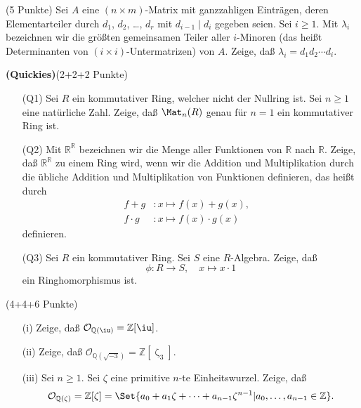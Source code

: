 \documentclass{algsheet}
\begin{document}
\begin{exercise}(5 Punkte)\newline
    Sei \(A\) eine \((n \times m)\)-Matrix mit ganzzahligen Einträgen, deren
    Elementarteiler durch \(d_1\), \(d_2\), \dots, \(d_r\) mit \(d_{i - 1} \mid
    d_i\) gegeben seien. Sei \(i \ge 1\).
    Mit \(\lambda_i\) bezeichnen wir die größten
    gemeinsamen Teiler aller \(i\)-Minoren (das heißt Determinanten von
    \((i \times i)\)-Untermatrizen) von \(A\). Zeige, daß \(\lambda_i = d_1
    d_2 \dotsm d_i\).
\end{exercise}


\newpage

\begin{exercise}\textbf{(Quickies)}(2+2+2 Punkte)\vspace{-1ex}
 \begin{itemize}
  \item [(Q1)]  Sei \(R\) ein kommutativer Ring, welcher nicht der Nullring ist. Sei
    \(n \ge 1\) eine natürliche Zahl. Zeige,
    daß \(\Mat_n(R)\) genau für \(n = 1\) ein kommutativer Ring ist.
  \item [(Q2)] 
    Mit \(\mathbb R^{\mathbb R}\) bezeichnen wir die Menge aller Funktionen von
    \(\mathbb R\) nach \(\mathbb R\). Zeige, daß \(\mathbb R^{\mathbb R}\) zu einem Ring
    wird, wenn wir die Addition und Multiplikation durch die übliche Addition
    und Multiplikation von Funktionen definieren, das heißt durch
    \begin{align}
        f + g&\colon x \mapsto f(x) + g(x),& \\
        f \cdot g&\colon x \mapsto f(x) \cdot g(x)
    \end{align}
    definieren.
  \item [(Q3)] 
    Sei \(R\) ein kommutativer Ring. Sei \(S\) eine \(R\)-Algebra. Zeige, daß
    \begin{equation}
        \phi\colon R \to S,\quad x \mapsto x \cdot 1
    \end{equation}
    ein Ringhomorphismus ist.
 \end{itemize}
\end{exercise}



\begin{exercise}(4+4+6 Punkte)\vspace{-1ex}
 \begin{itemize}
  \item [(i)] 
    Zeige, daß \(\mathcal O_{\mathbb Q(\iu)} = \mathbb Z[\iu]\).
  \item [(ii)] 
    Zeige, daß \(\mathcal O_{\mathbb Q(\sqrt{-3})} = \mathbb Z[\upzeta_3]\).
  \item [(iii)] 
    Sei \(n \ge 1\).
    Sei \(\zeta\) eine primitive \(n\)-te Einheitswurzel.
    Zeige, daß
    \begin{equation}
        \mathcal O_{\mathbb Q(\zeta)} = \mathbb Z[\zeta] = \Set{a_0 + a_1 \zeta
        + \dotsb + a_{n - 1} \zeta^{n - 1} \vert a_0, \dotsc, a_{n - 1} \in
        \mathbb Z}.
    \end{equation}
 \end{itemize}
\end{exercise}
\end{document}

